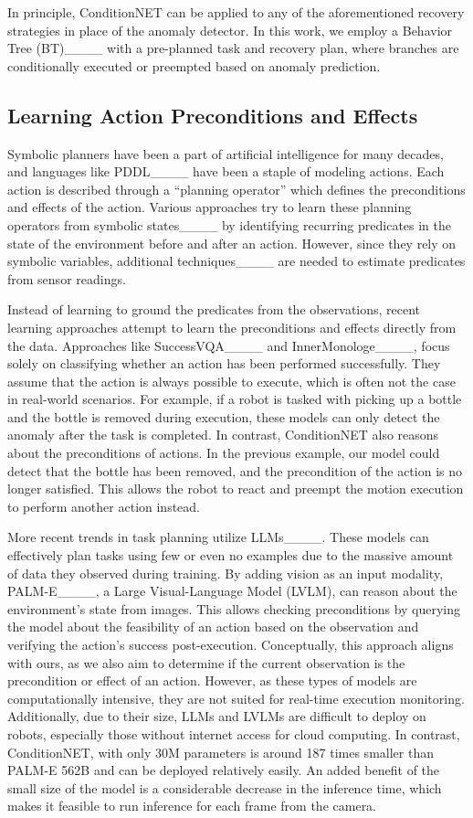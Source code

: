 In principle, ConditionNET can be applied to any of the aforementioned recovery strategies in place of the anomaly detector. In this work, we employ a Behavior Tree (BT)____ with a pre-planned task and recovery plan, where branches are conditionally executed or preempted based on anomaly prediction. 

\subsection{Learning Action Preconditions and Effects}
Symbolic planners have been a part of artificial intelligence for many decades, and languages like PDDL____ have been a staple of modeling actions. Each action is described through a ``planning operator'' which defines the preconditions and effects of the action. Various approaches try to learn these planning operators from symbolic states____ by identifying recurring predicates in the state of the environment before and after an action. However, since they rely on symbolic variables, additional techniques____ are needed to estimate predicates from sensor readings.

Instead of learning to ground the predicates from the observations, recent learning approaches attempt to learn the preconditions and effects directly from the data. Approaches like SuccessVQA____ and InnerMonologe____, focus solely on classifying whether an action has been performed successfully. They assume that the action is always possible to execute, which is often not the case in real-world scenarios. For example, if a robot is tasked with picking up a bottle and the bottle is removed during execution, these models can only detect the anomaly after the task is completed. In contrast, ConditionNET also reasons about the preconditions of actions. In the previous example, our model could detect that the bottle has been removed, and the precondition of the action is no longer satisfied. This allows the robot to react and preempt the motion execution to perform another action instead.

More recent trends in task planning utilize LLMs____. These models can effectively plan tasks using few or even no examples due to the massive amount of data they observed during training. By adding vision as an input modality, PALM-E____, a Large Visual-Language Model (LVLM), can reason about the environment's state from images. This allows checking preconditions by querying the model about the feasibility of an action based on the observation and verifying the action's success post-execution. Conceptually, this approach aligns with ours, as we also aim to determine if the current observation is the precondition or effect of an action. However, as these types of models are computationally intensive, they are not suited for real-time execution monitoring. Additionally, due to their size, LLMs and LVLMs are difficult to deploy on robots, especially those without internet access for cloud computing. In contrast, ConditionNET, with only 30M parameters is around 187 times smaller than PALM-E 562B and can be deployed relatively easily. An added benefit of the small size of the model is a considerable decrease in the inference time, which makes it feasible to run inference for each frame from the camera.

